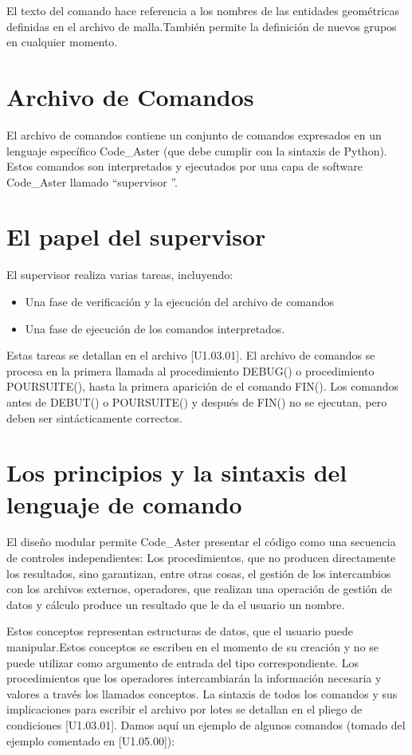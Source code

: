 \documentclass[12pt]{book}
\theoremstyle{definition}
\theoremstyle{remark}
\theoremstyle{plain}
\begin{document}
\begin{itemize}
El texto del comando hace referencia a los nombres de las entidades geométricas definidas en el 
archivo de malla.También permite la definición de nuevos grupos en cualquier momento.
\end{itemize}

\section{Archivo de Comandos}
El archivo de comandos contiene un conjunto de comandos expresados en un lenguaje específico Code\_Aster (que debe cumplir con la sintaxis de Python).
Estos comandos son interpretados y ejecutados por una capa de software Code\_Aster llamado ``supervisor ''.

\section{El papel del supervisor}
El supervisor realiza varias tareas, incluyendo:
\begin{itemize}
 \item Una fase de verificación y la ejecución del archivo de comandos
 \item Una fase de ejecución de los comandos interpretados.
\end{itemize}
Estas tareas se detallan en el archivo [U1.03.01].
El archivo de comandos se procesa en la primera llamada al procedimiento DEBUG() o procedimiento POURSUITE(),
hasta la primera aparición de el comando FIN(). Los comandos antes de DEBUT() o POURSUITE() y después de
FIN() no se ejecutan, pero deben ser sintácticamente correctos.

\section{Los principios y la sintaxis del lenguaje de comando}
El diseño modular permite Code\_Aster presentar el código como una secuencia de controles independientes:
Los procedimientos, que no producen directamente los resultados, sino garantizan, entre otras cosas, el gestión de los intercambios con los archivos externos,
operadores, que realizan una operación de gestión de datos y cálculo produce un resultado que le da el usuario un nombre.

Estos conceptos representan estructuras de datos, que el usuario puede manipular.Estos conceptos se escriben en el momento de su creación y 
no se puede utilizar como argumento de entrada del tipo correspondiente. 
Los procedimientos que los operadores intercambiarán la información necesaria y valores a través los llamados conceptos.
La sintaxis de todos los comandos y sus implicaciones para escribir el archivo por lotes se detallan en el pliego de condiciones [U1.03.01]. 
Damos aquí un ejemplo de algunos comandos (tomado del ejemplo comentado en [U1.05.00]):
\end{document}
